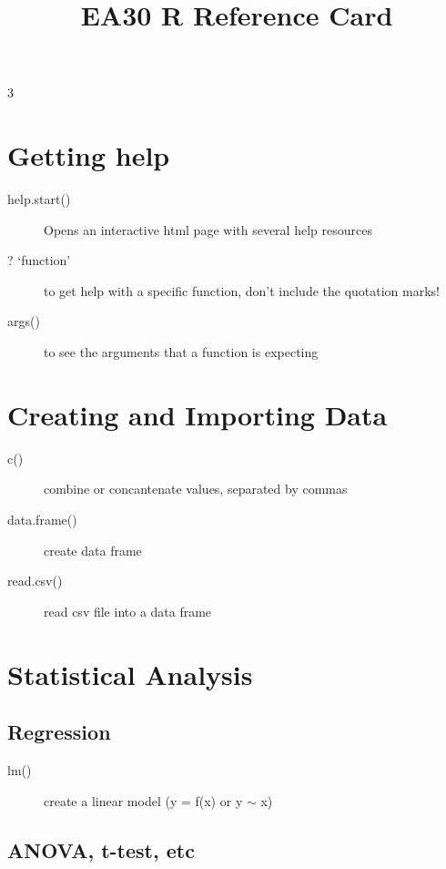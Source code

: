 \documentclass{article}\usepackage[]{graphicx}\usepackage[]{xcolor}
\title{EA30 R Reference Card}
\begin{document}
\maketitle

\begin{multicols}{3}


\section*{Getting help}

\begin{description}
  \item[help.start()] Opens an interactive html page with several help resources
  \item[? `function'] to get help with a specific function, don't include the quotation marks!
  \item[args()] to see the arguments that a function is expecting
\end{description}

\section*{Creating and Importing Data}

\begin{description}
\item[c()] combine or concantenate values, separated by commas
\item[data.frame()] create data frame
\item[read.csv()] read csv file into a data frame
\end{description}

\section*{Statistical Analysis}

\subsection*{Regression}

\begin{description}
\item[lm()] create a linear model (y = f(x) or y $\sim$ x)
\end{description}

\subsection*{ANOVA, t-test, etc}


\end{multicols}
\end{document}
